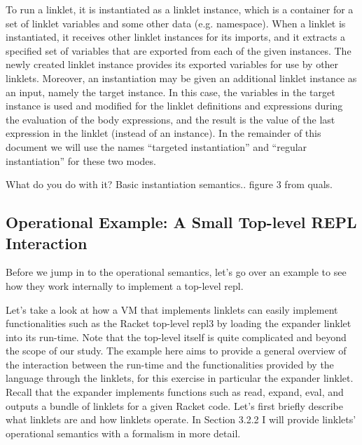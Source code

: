 		To run a linklet, it is instantiated as a linklet instance, which is a container for a set of linklet variables and some other data (e.g. namespace). When a linklet is instantiated, it receives other linklet instances for its imports, and it extracts a specified set of variables that are exported from each of the given instances. The newly created linklet instance provides its exported variables for use by other linklets. Moreover, an instantiation may be given an additional linklet instance as an input, namely the target instance. In this case, the variables in the target instance is used and modified for the linklet definitions and expressions during the evaluation of the body expressions, and the result is the value of the last expression in the linklet (instead of an instance). In the remainder of this document we will use the names “targeted instantiation” and “regular instantiation” for these two modes. 



		\begin{paragraph-here}
			What do you do with it? Basic instantiation semantics.. figure 3 from quals.
		\end{paragraph-here}

		\subsection{Operational Example: A Small Top-level REPL Interaction}

		\begin{paragraph-here}
			Before we jump in to the operational semantics, let's go over an example to see how they work internally to implement a top-level repl.

			Let’s take a look at how a VM that implements linklets can easily implement functionalities such as the Racket top-level repl3 by loading the expander linklet into its run-time. Note that the top-level itself is quite complicated and beyond the scope of our study. The example here aims to provide a general overview of the interaction between the run-time and the functionalities provided by the language through the linklets, for this exercise in particular the expander linklet. Recall that the expander implements functions such as read, expand, eval, and outputs a bundle of linklets for a given Racket code. Let’s first briefly describe what linklets are and how linklets operate. In Section 3.2.2 I will provide linklets’ operational semantics with a formalism in more detail.
		\end{paragraph-here}


